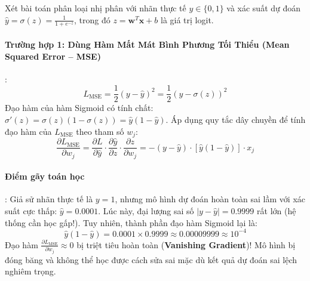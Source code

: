 Xét bài toán phân loại nhị phân với nhãn thực tế $y \in \{0, 1\}$ và xác suất dự đoán $\hat{y} = \sigma(z) = \frac{1}{1 + e^{-z}}$, trong đó $z = \mathbf{w}^T \mathbf{x} + b$ là giá trị logit.

\paragraph{Trường hợp 1: Dùng Hàm Mất Mát Bình Phương Tối Thiểu (Mean Squared Error -- MSE)}:
\begin{equation}
L_{\text{MSE}} = \frac{1}{2}(y - \hat{y})^2 = \frac{1}{2}(y - \sigma(z))^2
\end{equation}
Đạo hàm của hàm Sigmoid có tính chất: $\sigma'(z) = \sigma(z)(1 - \sigma(z)) = \hat{y}(1 - \hat{y})$.
Áp dụng quy tắc dây chuyền để tính đạo hàm của $L_{\text{MSE}}$ theo tham số $w_j$:
\begin{equation}
\frac{\partial L_{\text{MSE}}}{\partial w_j} = \frac{\partial L}{\partial \hat{y}} \cdot \frac{\partial \hat{y}}{\partial z} \cdot \frac{\partial z}{\partial w_j} = - (y - \hat{y}) \cdot \left[ \hat{y}(1 - \hat{y}) \right] \cdot x_j
\label{eq:mse-derivative-collapse}
\end{equation}

\paragraph{Điểm gãy toán học}:
Giả sử nhãn thực tế là $y = 1$, nhưng mô hình dự đoán hoàn toàn sai lầm với xác suất cực thấp: $\hat{y} = 0.0001$.
Lúc này, đại lượng sai số $|y - \hat{y}| = 0.9999$ rất lớn (hệ thống cần học gấp!). Tuy nhiên, thành phần đạo hàm Sigmoid lại là:
\begin{equation*}
\hat{y}(1 - \hat{y}) = 0.0001 \times 0.9999 \approx 0.00009999 \approx 10^{-4}
\end{equation*}
Đạo hàm $\frac{\partial L_{\text{MSE}}}{\partial w_j} \approx 0$ bị triệt tiêu hoàn toàn (\textbf{Vanishing Gradient})! Mô hình bị đóng băng và không thể học được cách sửa sai mặc dù kết quả dự đoán sai lệch nghiêm trọng.

